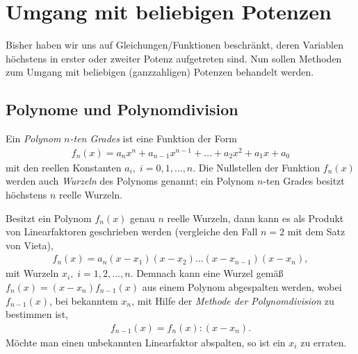 \section{Umgang mit beliebigen Potenzen}

Bisher haben wir uns auf Gleichungen/Funktionen beschränkt, deren Variablen höchstens in erster oder zweiter Potenz aufgetreten sind. Nun sollen Methoden zum Umgang mit beliebigen (ganzzahligen) Potenzen behandelt werden. 

\subsection{Polynome und Polynomdivision}

Ein \emph{Polynom} $n$\emph{-ten Grades} ist eine Funktion der Form 
\begin{align}
    f_n(x) = a_n x^n + a_{n-1} x^{n-1} + \hdots + a_2 x^2 + a_1 x + a_0
\end{align}
mit den reellen Konstanten $a_i,\; i = 0,1,\hdots,n$. Die Nullstellen der Funktion $f_n(x)$ werden auch \emph{Wurzeln} des Polynoms genannt; ein Polynom $n$-ten Grades besitzt höchstens $n$ reelle Wurzeln. 

Besitzt ein Polynom $f_n(x)$ genau $n$ reelle Wurzeln, dann kann es als Produkt von Linearfaktoren geschrieben werden (vergleiche den Fall $n=2$ mit dem Satz von Vieta), 
\begin{align}
    f_n(x) = a_n (x-x_1)(x-x_2)\hdots (x-x_{n-1})(x-x_n),
\end{align}
mit Wurzeln $x_i, \; i=1,2,\hdots,n$. Demnach kann eine Wurzel gemäß $f_n(x) = (x-x_n)f_{n-1}(x)$ aus einem Polynom abgespalten werden, wobei $f_{n-1}(x)$, bei bekanntem $x_n$, mit Hilfe der \emph{Methode der Polynomdivision} zu bestimmen ist,
\begin{align}
    f_{n-1}(x) = f_n(x) : (x-x_n).
\end{align}
Möchte man einen unbekannten Linearfaktor abspalten, so ist ein $x_i$ zu erraten.

